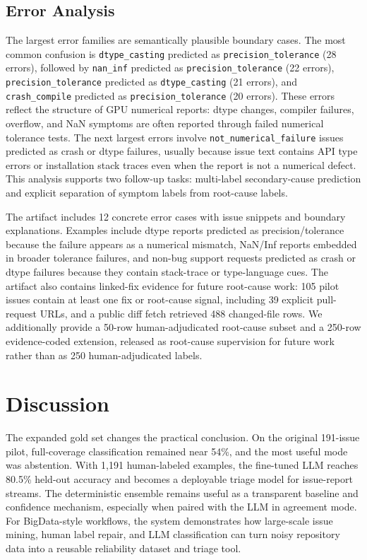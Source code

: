 \documentclass[conference]{IEEEtran}
\begin{document}
\subsection{Error Analysis}

The largest error families are semantically plausible boundary cases. The most
common confusion is \texttt{dtype\_casting} predicted as
\texttt{precision\_tolerance} (28 errors), followed by \texttt{nan\_inf}
predicted as \texttt{precision\_tolerance} (22 errors),
\texttt{precision\_tolerance} predicted as \texttt{dtype\_casting} (21 errors),
and \texttt{crash\_compile} predicted as \texttt{precision\_tolerance} (20
errors). These errors reflect the structure of GPU numerical reports: dtype
changes, compiler failures, overflow, and NaN symptoms are often reported
through failed numerical tolerance tests. The next largest errors involve
\texttt{not\_numerical\_failure} issues predicted as crash or dtype failures,
usually because issue text contains API type errors or installation stack
traces even when the report is not a numerical defect. This analysis supports
two follow-up tasks: multi-label secondary-cause prediction and explicit
separation of symptom labels from root-cause labels.

The artifact includes 12 concrete error cases with issue snippets and boundary
explanations. Examples include dtype reports predicted as precision/tolerance
because the failure appears as a numerical mismatch, NaN/Inf reports embedded
in broader tolerance failures, and non-bug support requests predicted as crash
or dtype failures because they contain stack-trace or type-language cues. The
artifact also contains linked-fix evidence for future root-cause work: 105
pilot issues contain at least one fix or root-cause signal, including 39
explicit pull-request URLs, and a public diff fetch retrieved 488 changed-file
rows. We additionally provide a 50-row human-adjudicated root-cause subset and
a 250-row evidence-coded extension, released as root-cause supervision for
future work rather than as 250 human-adjudicated labels.

\section{Discussion}

The expanded gold set changes the practical conclusion. On the original
191-issue pilot, full-coverage classification remained near 54\%, and the most
useful mode was abstention. With 1,191 human-labeled examples, the fine-tuned
LLM reaches 80.5\% held-out accuracy and becomes a deployable triage model for
issue-report streams. The deterministic ensemble remains useful as a
transparent baseline and confidence mechanism, especially when paired with the
LLM in agreement mode. For BigData-style workflows, the system demonstrates how
large-scale issue mining, human label repair, and LLM classification can turn
noisy repository data into a reusable reliability dataset and triage tool.
\end{document}
